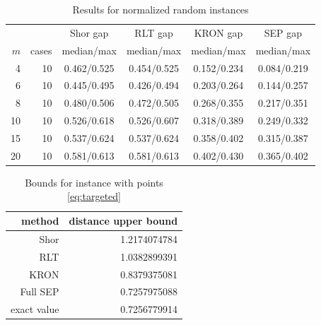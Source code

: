 \documentclass[11pt]{article}
\begin{document}
\begin{table}
\caption{Results for normalized random instances}
\label{tab:random}
\vskip 10pt
\centering
\begin{tabular}{rr|c|c|c|c}
\toprule
 & &Shor gap &  RLT gap & KRON gap & SEP gap\\
\(m\) & cases & median/max & median/max & median/max& median/max\\
\midrule
4  & 10 & 0.462/0.525 & 0.454/0.525 & 0.152/0.234 & 0.084/0.219 \\
6  & 10 & 0.445/0.495 & 0.426/0.494 & 0.203/0.264 & 0.144/0.257 \\
8  & 10 & 0.480/0.506 & 0.472/0.505 & 0.268/0.355 & 0.217/0.351 \\
10 & 10 & 0.526/0.618 & 0.526/0.607 & 0.318/0.389 & 0.249/0.332 \\
15 & 10 & 0.537/0.624 & 0.537/0.624 & 0.358/0.402 & 0.315/0.387 \\
20 & 10 & 0.581/0.613 & 0.581/0.613 & 0.402/0.430 & 0.365/0.402 \\
\bottomrule
\end{tabular}
\end{table}

\begin{table}\caption{Bounds for instance with points \eqref{eq:targeted}}
\label{tab:targeted}
\centering
\vskip 10pt
\begin{tabular}{r|r}
\toprule
method & distance upper bound \\
\midrule
Shor     & 1.2174074784 \\
RLT      & 1.0382899391 \\
KRON     & 0.8379375081 \\
Full SEP & 0.7257975088 \\
\midrule
exact value & 0.7256779914 \\
\bottomrule
\end{tabular}

\end{table}
\end{document}
